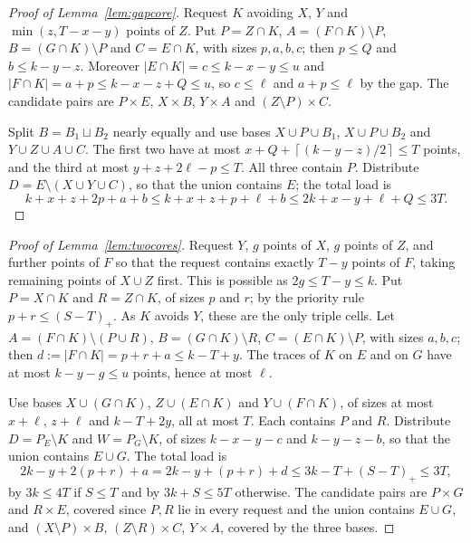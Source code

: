 \documentclass[11pt]{article}
\numberwithin{equation}{section}
\theoremstyle{definition}
\theoremstyle{remark}
\newcommand{\ceil}[1]{\left\lceil #1\right\rceil}
\begin{document}
\begin{proof}[Proof of Lemma~\ref{lem:gapcore}]
Request $K$ avoiding $X$, $Y$ and $\min(z,T-x-y)$ points of $Z$. Put
$P=Z\cap K$, $A=(F\cap K)\setminus P$, $B=(G\cap K)\setminus P$ and
$C=E\cap K$, with sizes $p,a,b,c$; then $p\le Q$ and $b\le k-y-z$.
Moreover $|E\cap K|=c\le k-x-y\le u$ and
$|F\cap K|=a+p\le k-x-z+Q\le u$, so $c\le\ell$ and $a+p\le\ell$ by the gap.
The candidate pairs are $P\times E$, $X\times B$, $Y\times A$ and
$(Z\setminus P)\times C$.

Split $B=B_1\sqcup B_2$ nearly equally and use bases $X\cup P\cup B_1$,
$X\cup P\cup B_2$ and $Y\cup Z\cup A\cup C$. The first two have at most
$x+Q+\ceil{(k-y-z)/2}\le T$ points, and the third at most
$y+z+2\ell-p\le T$. All three contain $P$. Distribute
$D=E\setminus(X\cup Y\cup C)$, so that the union contains $E$; the total
load is
\[
 k+x+z+2p+a+b\le k+x+z+p+\ell+b\le2k+x-y+\ell+Q\le3T .
\]
\end{proof}

\begin{proof}[Proof of Lemma~\ref{lem:twocores}]
Request $Y$, $g$ points of $X$, $g$ points of $Z$, and further points of
$F$ so that the request contains exactly $T-y$ points of $F$, taking
remaining points of $X\cup Z$ first. This is possible as
$2g\le T-y\le k$. Put $P=X\cap K$ and $R=Z\cap K$, of sizes $p$ and $r$;
by the priority rule $p+r\le(S-T)_+$. As $K$ avoids $Y$, these are the
only triple cells. Let $A=(F\cap K)\setminus(P\cup R)$,
$B=(G\cap K)\setminus R$, $C=(E\cap K)\setminus P$, with sizes $a,b,c$;
then $d:=|F\cap K|=p+r+a\le k-T+y$. The traces of $K$ on $E$ and on $G$
have at most $k-y-g\le u$ points, hence at most $\ell$.

Use bases $X\cup(G\cap K)$, $Z\cup(E\cap K)$ and $Y\cup(F\cap K)$, of
sizes at most $x+\ell$, $z+\ell$ and $k-T+2y$, all at most $T$. Each
contains $P$ and $R$. Distribute $D=P_E\setminus K$ and
$W=P_G\setminus K$, of sizes $k-x-y-c$ and $k-y-z-b$, so that the union
contains $E\cup G$. The total load is
\[
 2k-y+2(p+r)+a=2k-y+(p+r)+d\le3k-T+(S-T)_+\le3T,
\]
by $3k\le4T$ if $S\le T$ and by $3k+S\le5T$ otherwise. The candidate pairs
are $P\times G$ and $R\times E$, covered since $P,R$ lie in every request
and the union contains $E\cup G$, and $(X\setminus P)\times B$,
$(Z\setminus R)\times C$, $Y\times A$, covered by the three bases.
\end{proof}
\end{document}

